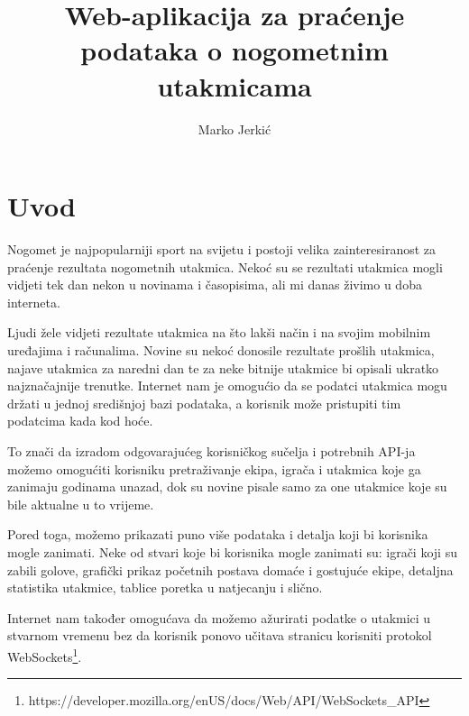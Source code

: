 \documentclass[times, utf8, zavrsni]{fer}
\begin{document}

\title{Web-aplikacija za praćenje podataka o nogometnim utakmicama}

\author{Marko Jerkić}

\maketitle


\zahvala{}

\tableofcontents

\chapter{Uvod}

Nogomet je najpopularniji sport na svijetu i postoji velika zainteresiranost za praćenje rezultata nogometnih utakmica.
Nekoć su se rezultati utakmica mogli vidjeti tek dan nekon u novinama i časopisima, ali mi danas živimo u doba interneta.

Ljudi žele vidjeti rezultate utakmica na što lakši način i na svojim mobilnim uređajima i računalima.
Novine su nekoć donosile rezultate prošlih utakmica, najave utakmica za naredni dan te za neke bitnije utakmice bi opisali ukratko najznačajnije trenutke.
Internet nam je omogućio da se podatci utakmica mogu držati u jednoj središnjoj bazi podataka, a korisnik može pristupiti tim podatcima kada kod hoće.

To znači da izradom odgovarajućeg korisničkog sučelja i potrebnih API-ja možemo omogućiti korisniku pretraživanje ekipa, igrača i utakmica koje ga zanimaju godinama unazad, dok su novine pisale samo za one utakmice koje su bile aktualne u to vrijeme.

Pored toga, možemo prikazati puno više podataka i detalja koji bi korisnika mogle zanimati.
Neke od stvari koje bi korisnika mogle zanimati su: igrači koji su zabili golove, grafički prikaz početnih postava domaće i gostujuće ekipe, detaljna statistika utakmice, tablice poretka u natjecanju i slično.

Internet nam također omogućava da možemo ažurirati podatke o utakmici u stvarnom vremenu bez da korisnik ponovo učitava stranicu korisniti protokol WebSockets\footnote{https://developer.mozilla.org/en\-US/docs/Web/API/WebSockets\_API}.
\end{document}
